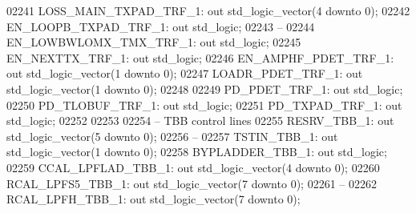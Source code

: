 \begin{DoxyCode}
02241     LOSS\_MAIN\_TXPAD\_TRF\_1:  \textcolor{keywordflow}{out} \textcolor{comment}{std\_logic\_vector}(\textcolor{vhdllogic}{}\textcolor{vhdllogic}{4} \textcolor{keywordflow}{downto} \textcolor{vhdllogic}{}\textcolor{vhdllogic}{0});
02242     EN\_LOOPB\_TXPAD\_TRF\_1:   \textcolor{keywordflow}{out} \textcolor{comment}{std\_logic};
02243 \textcolor{keyword}{    --}
02244     EN\_LOWBWLOMX\_TMX\_TRF\_1: \textcolor{keywordflow}{out} \textcolor{comment}{std\_logic};
02245     EN\_NEXTTX\_TRF\_1:    \textcolor{keywordflow}{out} \textcolor{comment}{std\_logic};
02246     EN\_AMPHF\_PDET\_TRF\_1:    \textcolor{keywordflow}{out} \textcolor{comment}{std\_logic\_vector}(\textcolor{vhdllogic}{}\textcolor{vhdllogic}{1} \textcolor{keywordflow}{downto} \textcolor{vhdllogic}{}\textcolor{vhdllogic}{0});
02247     LOADR\_PDET\_TRF\_1:   \textcolor{keywordflow}{out} \textcolor{comment}{std\_logic\_vector}(\textcolor{vhdllogic}{}\textcolor{vhdllogic}{1} \textcolor{keywordflow}{downto} \textcolor{vhdllogic}{}\textcolor{vhdllogic}{0});
02248 
02249     PD\_PDET\_TRF\_1:  \textcolor{keywordflow}{out} \textcolor{comment}{std\_logic};
02250     PD\_TLOBUF\_TRF\_1:    \textcolor{keywordflow}{out} \textcolor{comment}{std\_logic};
02251     PD\_TXPAD\_TRF\_1: \textcolor{keywordflow}{out} \textcolor{comment}{std\_logic};
02252 
02253 
02254 \textcolor{keyword}{    -- TBB control lines}
02255     RESRV\_TBB\_1:    \textcolor{keywordflow}{out} \textcolor{comment}{std\_logic\_vector}(\textcolor{vhdllogic}{}\textcolor{vhdllogic}{5} \textcolor{keywordflow}{downto} \textcolor{vhdllogic}{}\textcolor{vhdllogic}{0});
02256 \textcolor{keyword}{    --}
02257     TSTIN\_TBB\_1:    \textcolor{keywordflow}{out} \textcolor{comment}{std\_logic\_vector}(\textcolor{vhdllogic}{}\textcolor{vhdllogic}{1} \textcolor{keywordflow}{downto} \textcolor{vhdllogic}{}\textcolor{vhdllogic}{0});
02258     BYPLADDER\_TBB\_1:    \textcolor{keywordflow}{out} \textcolor{comment}{std\_logic};
02259     CCAL\_LPFLAD\_TBB\_1:  \textcolor{keywordflow}{out} \textcolor{comment}{std\_logic\_vector}(\textcolor{vhdllogic}{}\textcolor{vhdllogic}{4} \textcolor{keywordflow}{downto} \textcolor{vhdllogic}{}\textcolor{vhdllogic}{0});
02260     RCAL\_LPFS5\_TBB\_1:   \textcolor{keywordflow}{out} \textcolor{comment}{std\_logic\_vector}(\textcolor{vhdllogic}{}\textcolor{vhdllogic}{7} \textcolor{keywordflow}{downto} \textcolor{vhdllogic}{}\textcolor{vhdllogic}{0});
02261 \textcolor{keyword}{    --}
02262     RCAL\_LPFH\_TBB\_1:    \textcolor{keywordflow}{out} \textcolor{comment}{std\_logic\_vector}(\textcolor{vhdllogic}{}\textcolor{vhdllogic}{7} \textcolor{keywordflow}{downto} \textcolor{vhdllogic}{}\textcolor{vhdllogic}{0});

\end{DoxyCode}
